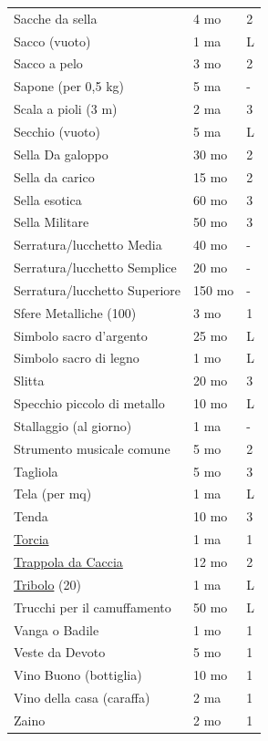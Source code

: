\begin{multicols}{2}
\begin{tabular}{p{5.1cm}p{1.5cm}p{0.7cm}}
\rowcolor{gray!20}Sacche da sella & 4 mo & 2 \\
Sacco (vuoto) & 1 ma & L \\
\rowcolor{gray!20}Sacco a pelo & 3 mo & 2 \\
Sapone (per 0,5 kg) & 5 ma & - \\
\rowcolor{gray!20}Scala a pioli (3 m) & 2 ma & 3 \\
Secchio (vuoto) & 5 ma & L \\
\rowcolor{gray!20}Sella Da galoppo & 30 mo & 2 \\
Sella da carico & 15 mo & 2 \\
\rowcolor{gray!20}Sella esotica & 60 mo & 3 \\
Sella Militare & 50 mo & 3 \\
\rowcolor{gray!20}Serratura/lucchetto Media & 40 mo & - \\
Serratura/lucchetto Semplice & 20 mo & - \\
\rowcolor{gray!20}Serratura/lucchetto Superiore & 150 mo & - \\
Sfere Metalliche (100) & 3 mo & 1 \\
\rowcolor{gray!20}Simbolo sacro d'argento & 25 mo & L \\
Simbolo sacro di legno & 1 mo & L \\
\rowcolor{gray!20}Slitta & 20 mo & 3 \\
Specchio piccolo di metallo & 10 mo & L \\
\rowcolor{gray!20}Stallaggio (al giorno) & 1 ma & - \\
Strumento musicale comune & 5 mo & 2 \\
\rowcolor{gray!20}Tagliola & 5 mo & 3 \\
Tela (per mq) & 1 ma & L \\
\rowcolor{gray!20}Tenda & 10 mo & 3 \\
\hyperlink{Torcia}{Torcia} & 1 ma & 1 \\
\rowcolor{gray!20}\hyperlink{Trappola da Caccia}{Trappola da Caccia} & 12 mo & 2\\
\hyperlink{Tribolo}{Tribolo} (20) & 1 ma & L \\
\rowcolor{gray!20}Trucchi per il camuffamento & 50 mo & L \\
Vanga o Badile & 1 mo & 1 \\
\rowcolor{gray!20}Veste da Devoto & 5 mo & 1 \\
Vino Buono (bottiglia) & 10 mo & 1 \\
\rowcolor{gray!20}Vino della casa (caraffa) & 2 ma & 1 \\
Zaino & 2 mo & 1 \\
\end{tabular}


\end{multicols}
